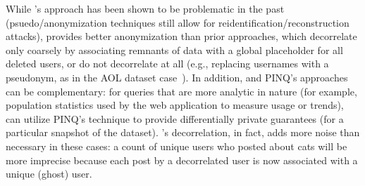 While \sys{}'s approach has been shown to be problematic in the past (psuedo/anonymization
techniques still allow for reidentification/reconstruction attacks), \sys{} provides better
anonymization than prior approaches, which decorrelate only coarsely by associating remnants of data
with a global placeholder for all deleted users, or do not decorrelate at all (e.g., replacing
usernames with a pseudonym, as in the AOL dataset case~\cite{aol}). In addition, \sys{} and PINQ's
approaches can be complementary: for queries that are more analytic in nature (for example,
population statistics used by the web application to measure usage or trends), \sys{} can utilize
PINQ's technique to provide differentially private guarantees (for a particular snapshot of the
dataset).  \sys{}'s decorrelation, in fact, adds more noise than necessary in these cases: a count
of unique users who posted about cats will be more imprecise because each post by a decorrelated
user is now associated with a unique (ghost) user.

%
%
%
%
%
